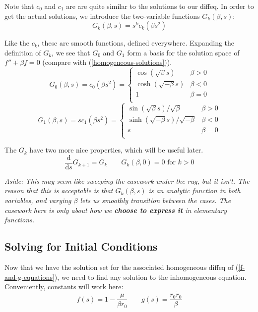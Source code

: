 \documentclass{article}
\newcommand{\dd}{\mathrm{d}}
\newcommand{\der}[2]{\frac{\dd #1}{\dd #2}}
\numberwithin{equation}{subsection}
\begin{document}
Note that $c_0$ and $c_1$ are are quite similar to the solutions to our diffeq. In order to
get the actual solutions, we introduce the two-variable functions $G_k(\beta, s)$:
\begin{equation}
G_k(\beta, s) = s^k c_k(\beta s^2)
\end{equation}

Like the $c_k$, these are smooth functions, defined everywhere. Expanding the definition of $G_k$, we see that $G_0$ and $G_1$ form a basis for the solution space of $f'' + \beta f = 0$ (compare with (\ref{homogeneous-solutions})).
\begin{equation}
G_0(\beta, s) = c_0(\beta s^2) = \begin{cases}
\cos(\sqrt{\beta} s)    & \beta > 0 \\
\cosh(\sqrt{-\beta} s)  & \beta < 0 \\
1                       & \beta = 0 \\
\end{cases}
\end{equation}
\begin{equation}
G_1(\beta, s) = s c_1(\beta s^2) = \begin{cases}
\sin(\sqrt{\beta} s) / \sqrt \beta      & \beta > 0 \\
\sinh(\sqrt{-\beta} s) / \sqrt{-\beta}  & \beta < 0 \\
s                                       & \beta = 0 \\
\end{cases}
\end{equation}

The $G_k$ have two more nice properties, which will be useful later.
\begin{equation}
\der{}{s} G_{k+1} = G_k  \qquad G_k(\beta, 0) = 0 \textrm{ for } k > 0
\end{equation}

\textit{Aside: This may seem like sweeping the casework under the rug, but it isn't. The reason that this is acceptable is that $G_k(\beta, s)$ is an analytic function in both variables, and varying $\beta$ lets us smoothly transition between the cases. The casework here is only about how we \textbf{choose to express it} in elementary functions.}

\subsection{Solving for Initial Conditions}

Now that we have the solution set for the associated homogeneous diffeq of (\ref{f-and-g-equations}), we need to find any solution to the inhomogeneous equation. Conveniently, constants will work here:
\begin{equation}
f(s) = 1 - \frac{\mu}{\beta r_0}  \qquad  g(s) = \frac{r_0 \dot{r}_0}{\beta}
\end{equation}
\end{document}
